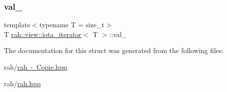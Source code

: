 \mbox{\label{structrah_1_1view_1_1iota__iterator_a7a2ef77dc1a09b2eea42804c2297d057}} 
\subsubsection{\texorpdfstring{val\_}{val\_}}
{\footnotesize\ttfamily template$<$typename T  = size\+\_\+t$>$ \\
T \mbox{\hyperlink{structrah_1_1view_1_1iota__iterator}{rah\+::view\+::iota\+\_\+iterator}}$<$ T $>$\+::val\+\_\+}



The documentation for this struct was generated from the following files\+:\begin{DoxyCompactItemize}
\item 
rah/\mbox{\hyperlink{rah_01-_01_copie_8hpp}{rah -\/ Copie.\+hpp}}\item 
rah/\mbox{\hyperlink{rah_8hpp}{rah.\+hpp}}\end{DoxyCompactItemize}
